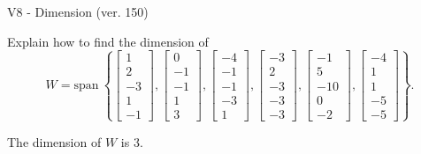 \begin{exercise}
  \begin{exerciseTitle}V8 - Dimension (ver. 150)\end{exerciseTitle}
  \begin{exerciseStatement}
    Explain how to find the dimension of 
\[W=\mathrm{span}\ \left\{\left[\begin{array}{r}
1 \\
2 \\
-3 \\
1 \\
-1
\end{array}\right] , \left[\begin{array}{r}
0 \\
-1 \\
-1 \\
1 \\
3
\end{array}\right] , \left[\begin{array}{r}
-4 \\
-1 \\
-1 \\
-3 \\
1
\end{array}\right] , \left[\begin{array}{r}
-3 \\
2 \\
-3 \\
-3 \\
-3
\end{array}\right] , \left[\begin{array}{r}
-1 \\
5 \\
-10 \\
0 \\
-2
\end{array}\right] , \left[\begin{array}{r}
-4 \\
1 \\
1 \\
-5 \\
-5
\end{array}\right]\right\}.\]



  \end{exerciseStatement}
  \begin{exerciseAnswer}
   The dimension of \(W\) is  \(3\).
  


  \end{exerciseAnswer}
\end{exercise}